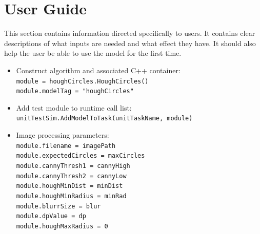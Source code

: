 
\section{User Guide}
This section contains information directed specifically to users. It contains clear descriptions of what inputs are needed and what effect they have. It should also help the user be able to use the model for the first time.

\begin{itemize}
\item Construct algorithm and associated C++ container:\\
\texttt{module = houghCircles.HoughCircles()}\\
\texttt{module.modelTag = "houghCircles"}\\
\item Add test module to runtime call list: \\
\texttt{unitTestSim.AddModelToTask(unitTaskName, module)}\\
\item Image processing parameters: \\
\texttt{module.filename = imagePath}\\
\texttt{module.expectedCircles = maxCircles}\\
\texttt{module.cannyThresh1 = cannyHigh}\\
\texttt{module.cannyThresh2 = cannyLow}\\
\texttt{module.houghMinDist = minDist}\\
\texttt{module.houghMinRadius = minRad}\\
\texttt{module.blurrSize = blur}\\
\texttt{module.dpValue = dp}\\
\texttt{module.houghMaxRadius = 0}
\end{itemize}

